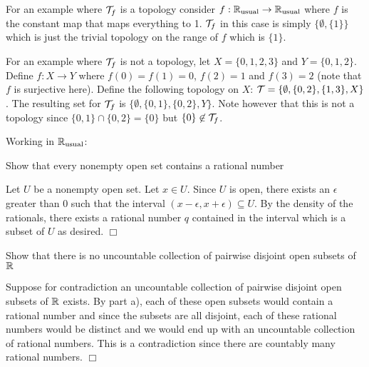\documentclass{article}
\begin{document}
\begin{spacedenumerate}
    For an example where $\mathcal{T}_{f}$ is a topology consider $f: \mathbb{R}_{\text{usual}}\to \mathbb{R}_{\text{usual}}$ where $f$ is the constant map that maps everything to 1. $\mathcal{T}_{f}$ in this case is simply $\{\emptyset, \{1\}\}$ which is just the trivial topology on the range of $f$ which is $\{1\}$.

    For an example where $\mathcal{T}_{f}$ is not a topology, let $X = \{0,1,2,3\}$ and $Y = \{0,1,2\}$. Define $f:X\to Y$ where $f(0) = f(1) = 0$, $f(2) = 1$ and $f(3) = 2$ (note that $f$ is surjective here). Define the following topology on $X$: $\mathcal{T} = \{\emptyset, \{0,2\}, \{1,3\}, X\}$. The resulting set for $\mathcal{T}_{f}$ is $\{\emptyset, \{0,1\}, \{0,2\}, Y\}$. Note however that this is not a topology since $\{0,1\}\cap \{0,2\} = \{0\}$ but $\{0\}\not\in \mathcal{T}_{f}$.

    \item Working in $\mathbb{R}_{\text{usual}}$:
    \begin{spacedenumerate}
        
        \item Show that every nonempty open set contains a rational number
        
        Let $U$ be a nonempty open set. Let $x\in U$. Since $U$ is open, there exists an $\epsilon$ greater than 0 such that the interval $(x-\epsilon, x+\epsilon)\subseteq U$. By the density of the rationals, there exists a rational number $q$ contained in the interval which is a subset of $U$ as desired. $\Box$

        \item Show that there is no uncountable collection of pairwise disjoint open subsets of $\mathbb{R}$
        
        Suppose for contradiction an uncountable collection of pairwise disjoint open subsets of $\mathbb{R}$ exists. By part a), each of these open subsets would contain a rational number and since the subsets are all disjoint, each of these rational numbers would be distinct and we would end up with an uncountable collection of rational numbers. This is a contradiction since there are countably many rational numbers. $\Box$
    \end{spacedenumerate}
\end{spacedenumerate}
\end{document}
